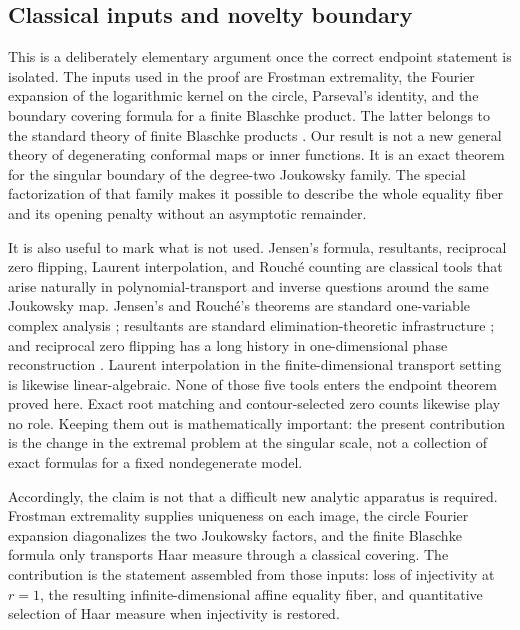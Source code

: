 \subsection*{Classical inputs and novelty boundary}

This is a deliberately elementary argument once the correct endpoint
statement is isolated.  The inputs used in the proof are Frostman
extremality, the Fourier expansion of the logarithmic kernel on the
circle, Parseval's identity, and the boundary covering formula for a
finite Blaschke product.  The latter belongs to the standard theory of
finite Blaschke products \citep{GarciaMashreghiRoss2018}.  Our result is
not a new general theory of degenerating conformal maps or inner
functions.  It is an exact theorem for the singular boundary of the
degree-two Joukowsky family.  The special factorization of that family
makes it possible to describe the whole equality fiber and its opening
penalty without an asymptotic remainder.

It is also useful to mark what is not used.  Jensen's formula,
resultants, reciprocal zero flipping, Laurent interpolation, and
Rouch\'e counting are classical tools that arise naturally in
polynomial-transport and inverse questions around the same Joukowsky
map.  Jensen's and Rouch\'e's theorems are standard one-variable
complex analysis \citep{Conway1973}; resultants are standard
elimination-theoretic infrastructure \citep{CoxLittleOShea1998}; and
reciprocal zero flipping has a long history in one-dimensional phase
reconstruction \citep{Akutowicz1956}.  Laurent interpolation in the
finite-dimensional transport setting is likewise linear-algebraic.
None of those five tools enters the endpoint theorem proved here.
Exact root matching and contour-selected zero counts likewise play no
role.  Keeping them out is mathematically important: the present
contribution is the change in the extremal problem at the singular
scale, not a collection of exact formulas for a fixed nondegenerate
model.

Accordingly, the claim is not that a difficult new analytic apparatus
is required.  Frostman extremality supplies uniqueness on each image,
the circle Fourier expansion diagonalizes the two Joukowsky factors,
and the finite Blaschke formula only transports Haar measure through a
classical covering.  The contribution is the statement assembled from
those inputs: loss of injectivity at \(r=1\), the resulting
infinite-dimensional affine equality fiber, and quantitative selection
of Haar measure when injectivity is restored.

